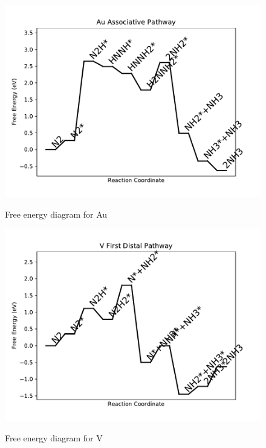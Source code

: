 \documentclass{article}
\begin{document}
\begin{figure}
\includegraphics[width=1\linewidth]{data/plots/Au_associative.pdf}
\label{fig:Au_associative}
\caption{Free energy diagram for Au}
\end{figure}

\begin{figure}
\includegraphics[width=1\linewidth]{data/plots/V_distal_1.pdf}
\label{fig:V_distal_1}
\caption{Free energy diagram for V}
\end{figure}
\end{document}

